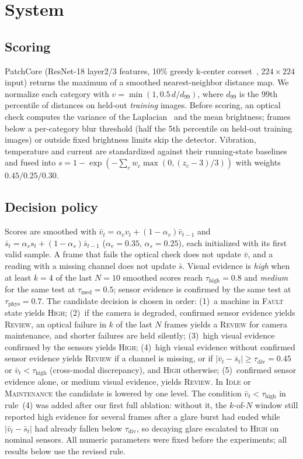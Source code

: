 \documentclass[conference]{IEEEtran}
\begin{document}
\section{System}\label{sec:system}
\subsection{Scoring}
PatchCore (ResNet-18 layer2/3 features, 10\% greedy k-center coreset~\cite{gonzalez1985clustering}, $224\times224$ input) returns the maximum of a smoothed nearest-neighbor distance map. We normalize each category with $v = \min(1, 0.5\,d / d_{99})$, where $d_{99}$ is the 99th percentile of distances on held-out \emph{training} images. Before scoring, an optical check computes the variance of the Laplacian~\cite{pech2000focus} and the mean brightness; frames below a per-category blur threshold (half the 5th percentile on held-out training images) or outside fixed brightness limits skip the detector. Vibration, temperature and current are standardized against their running-state baselines and fused into $s = 1 - \exp(-\sum_c w_c \max(0, (z_c - 3)/3))$ with weights $0.45/0.25/0.30$.

\subsection{Decision policy}
Scores are smoothed with $\bar v_t = \alpha_v v_t + (1-\alpha_v)\bar v_{t-1}$ and $\bar s_t = \alpha_s s_t + (1-\alpha_s)\bar s_{t-1}$ ($\alpha_v = 0.35$, $\alpha_s = 0.25$), each initialized with its first valid sample. A frame that fails the optical check does not update $\bar v$, and a reading with a missing channel does not update $\bar s$. Visual evidence is \emph{high} when at least $k=4$ of the last $N=10$ smoothed scores reach $\tau_{\text{high}}=0.8$ and \emph{medium} for the same test at $\tau_{\text{med}}=0.5$; sensor evidence is confirmed by the same test at $\tau_{\text{phys}}=0.7$. The candidate decision is chosen in order:
(1)~a machine in \textsc{Fault} state yields \textsc{High};
(2)~if the camera is degraded, confirmed sensor evidence yields \textsc{Review}, an optical failure in $k$ of the last $N$ frames yields a \textsc{Review} for camera maintenance, and shorter failures are held silently;
(3)~high visual evidence confirmed by the sensors yields \textsc{High};
(4)~high visual evidence without confirmed sensor evidence yields \textsc{Review} if a channel is missing, or if $|\bar v_t - \bar s_t| \ge \tau_{\text{div}}=0.45$ or $\bar v_t < \tau_{\text{high}}$ (cross-modal discrepancy), and \textsc{High} otherwise;
(5)~confirmed sensor evidence alone, or medium visual evidence, yields \textsc{Review}.
In \textsc{Idle} or \textsc{Maintenance} the candidate is lowered by one level. The condition $\bar v_t < \tau_{\text{high}}$ in rule~(4) was added after our first full ablation: without it, the $k$-of-$N$ window still reported high evidence for several frames after a glare burst had ended while $|\bar v_t - \bar s_t|$ had already fallen below $\tau_{\text{div}}$, so decaying glare escalated to \textsc{High} on nominal sensors. All numeric parameters were fixed before the experiments; all results below use the revised rule.
\end{document}
